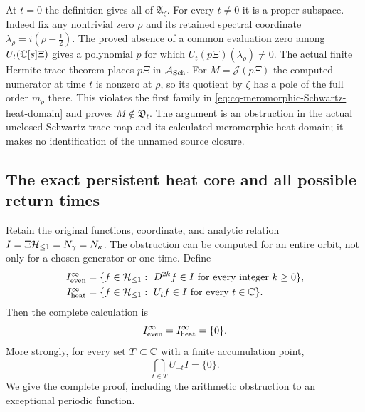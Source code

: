At $t=0$ the definition gives all of $\mathfrak A_\zeta$.
For every $t\ne0$ it is a proper subspace. Indeed fix any
nontrivial zero $\rho$ and its retained spectral coordinate
$\lambda_\rho=i(\rho-\tfrac12)$. The proved absence of a
common evaluation zero among $U_t(\mathbb C[s]\Xi)$ gives a
polynomial $p$ for which
$U_t(p\Xi)(\lambda_\rho)\ne0$. The actual finite Hermite
trace theorem places $p\Xi$ in $\mathcal A_{\rm Sch}$.
For $M=\mathscr J(p\Xi)$ the computed numerator at time $t$
is nonzero at $\rho$, so its quotient by $\zeta$ has a pole
of the full order $m_\rho$ there. This violates the first
family in \eqref{eq:cq-meromorphic-Schwartz-heat-domain} and
proves $M\notin\mathfrak D_t$. The argument is an obstruction
in the actual unclosed Schwartz trace map and its calculated
meromorphic heat domain; it makes no identification of the
unnamed source closure.

\subsection{The exact persistent heat core and all possible return times}
\label{sec:cq-persistent-heat-core}
Retain the original functions, coordinate, and analytic relation
$I=\Xi\mathcal H_{\leq 1}=N_\gamma=N_\kappa$. The obstruction can be computed
for an entire orbit, not only for a chosen generator or one time.
Define
\begin{equation}\label{eq:cq-persistent-cores}
 \begin{aligned}
 I_{\rm even}^{\infty}
   &=\{f\in\mathcal H_{\leq 1}:\ D^{2k}f\in I\text{ for every integer }k\geq0\},\\
 I_{\rm heat}^{\infty}
   &=\{f\in\mathcal H_{\leq 1}:\ U_tf\in I\text{ for every }t\in\mathbb C\}.
 \end{aligned}
\end{equation}
Then the complete calculation is
\begin{equation}\label{eq:cq-persistent-core-zero}
 I_{\rm even}^{\infty}=I_{\rm heat}^{\infty}=\{0\}.
\end{equation}
More strongly, for every set $T\subset\mathbb C$ with a finite
accumulation point,
\begin{equation}\label{eq:cq-accumulating-heat-times}
 \bigcap_{t\in T}U_{-t}I=\{0\}.
\end{equation}
We give the complete proof, including the arithmetic obstruction
to an exceptional periodic function.

